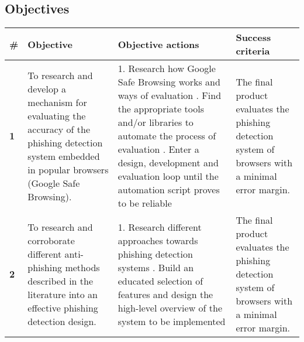 \begin{landscape}
	\begin{singlespace}
		\subsection{Objectives}
		\begin{center}
			\label{tab:OBJECTIVES}
			\begin{tabular}{ | m{0.5em} | m{18.5em} | m{23em}| m{16em} | }
				\hline
				\textbf{\#} & \textbf{Objective} & \textbf{Objective actions} &
				\textbf{Success criteria}                                       \\
				\hline
				\textbf{1}  &
				To research and develop a mechanism for evaluating the
				accuracy of the phishing detection system embedded in popular
				browsers (Google Safe Browsing).
				            &
				1. Research how Google Safe Browsing works and ways of evaluation
				\newline\newline
				2. Find the appropriate tools and/or libraries to automate the
				process of evaluation
				\newline\newline
				2. Enter a design, development and evaluation loop until the
				automation script proves to be reliable
				            &
				The final product evaluates the phishing detection system of
				browsers with a minimal error margin.                           \\


				\hline
				\textbf{2}  &
				To  research and corroborate different anti-phishing methods
				described in the literature into an effective phishing
				detection design.
				            &
				1. Research different approaches towards phishing detection
				systems
				\newline\newline
				2. Build an educated selection of features and design the
				high-level overview of the system to be implemented
				            &
				The final product evaluates the phishing detection system of
				browsers with a minimal error margin.                           \\



\end{tabular}
\end{center}
\end{singlespace}
\end{landscape}

